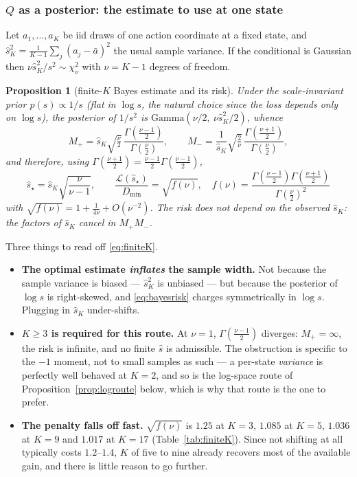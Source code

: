 \documentclass[11pt]{article}
\newtheorem{proposition}{Proposition}
\theoremstyle{definition}
\begin{document}
\subsubsection*{$Q$ as a posterior: the estimate to use at one state}

Let $a_1,\dots,a_K$ be iid draws of one action coordinate at a fixed state, and
$\hat s_K^2=\frac{1}{K-1}\sum_j(a_j-\bar a)^2$ the usual sample variance. If the
conditional is Gaussian then $\nu\hat s_K^2/s^2\sim\chi^2_\nu$ with
$\nu=K-1$ degrees of freedom.

\begin{proposition}[finite-$K$ Bayes estimate and its risk]
\label{prop:finiteK}
Under the scale-invariant prior $p(s)\propto1/s$ (flat in $\log s$, the natural
choice since the loss depends only on $\log s$), the posterior of $1/s^2$ is
$\mathrm{Gamma}(\nu/2,\ \nu\hat s_K^2/2)$, whence
\begin{equation}
  M_+=\hat s_K\sqrt{\tfrac\nu2}\,\frac{\Gamma(\frac{\nu-1}{2})}{\Gamma(\frac\nu2)},
  \qquad
  M_-=\frac{1}{\hat s_K}\sqrt{\tfrac2\nu}\,\frac{\Gamma(\frac{\nu+1}{2})}{\Gamma(\frac\nu2)},
\end{equation}
and therefore, using $\Gamma(\frac{\nu+1}{2})=\frac{\nu-1}{2}\Gamma(\frac{\nu-1}{2})$,
\begin{equation}
  \boxed{\;
  \hat s_\star=\hat s_K\sqrt{\frac{\nu}{\nu-1}},
  \qquad
  \frac{\mathcal L(\hat s_\star)}{D_{\min}}=\sqrt{f(\nu)},
  \quad
  f(\nu)=\frac{\Gamma(\frac{\nu-1}{2})\Gamma(\frac{\nu+1}{2})}{\Gamma(\frac{\nu}{2})^{2}}
  \;}
  \label{eq:finiteK}
\end{equation}
with $\sqrt{f(\nu)}=1+\frac{1}{4\nu}+O(\nu^{-2})$. The risk does not depend on the
observed $\hat s_K$: the factors of $\hat s_K$ cancel in $M_+M_-$.
\end{proposition}

Three things to read off \eqref{eq:finiteK}.

\begin{itemize}\itemsep2pt
  \item \textbf{The optimal estimate \emph{inflates} the sample width.} Not
  because the sample variance is biased --- $\hat s_K^2$ is unbiased --- but
  because the posterior of $\log s$ is right-skewed, and \eqref{eq:bayesrisk}
  charges symmetrically in $\log s$. Plugging in $\hat s_K$ under-shifts.
  \item \textbf{$K\ge3$ is required for this route.} At $\nu=1$,
  $\Gamma(\frac{\nu-1}{2})$ diverges: $M_+=\infty$, the risk is infinite, and no
  finite $\hat s$ is admissible. The obstruction is specific to the $-1$
  moment, not to small samples as such --- a per-state \emph{variance} is
  perfectly well behaved at $K=2$, and so is the log-space route of
  Proposition~\ref{prop:logroute} below, which is why that route is the one to
  prefer.
  \item \textbf{The penalty falls off fast.} $\sqrt{f(\nu)}$ is $1.25$ at $K=3$,
  $1.085$ at $K=5$, $1.036$ at $K=9$ and $1.017$ at $K=17$
  (Table~\ref{tab:finiteK}). Since not shifting at all typically costs
  $1.2$--$1.4$, $K$ of five to nine already recovers most of the available gain,
  and there is little reason to go further.
\end{itemize}
\end{document}
